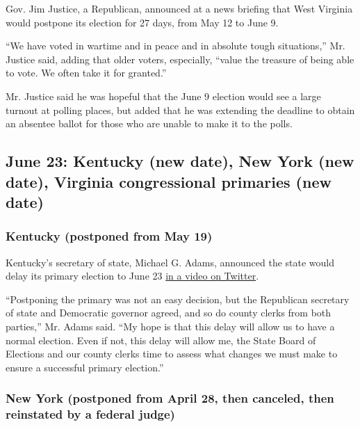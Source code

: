Gov. Jim Justice, a Republican, announced at a news briefing that West
Virginia would postpone its election for 27 days, from May 12 to June 9.

``We have voted in wartime and in peace and in absolute tough
situations,'' Mr. Justice said, adding that older voters, especially,
``value the treasure of being able to vote. We often take it for
granted.''

Mr. Justice said he was hopeful that the June 9 election would see a
large turnout at polling places, but added that he was extending the
deadline to obtain an absentee ballot for those who are unable to make
it to the polls.

\hypertarget{june-23-kentucky-new-date-new-york-new-date-virginia-congressional-primaries-new-date}{%
\subsection{June 23: Kentucky (new date), New York (new date), Virginia
congressional primaries (new
date)}\label{june-23-kentucky-new-date-new-york-new-date-virginia-congressional-primaries-new-date}}

\hypertarget{kentucky-postponed-from-may-19}{%
\subsubsection{Kentucky (postponed from May
19)}\label{kentucky-postponed-from-may-19}}

Kentucky's secretary of state, Michael G. Adams, announced the state
would delay its primary election to June 23
\href{https://twitter.com/KYSecState/status/1239657695520739328}{in a
video on Twitter}.

``Postponing the primary was not an easy decision, but the Republican
secretary of state and Democratic governor agreed, and so do county
clerks from both parties,'' Mr. Adams said. ``My hope is that this delay
will allow us to have a normal election. Even if not, this delay will
allow me, the State Board of Elections and our county clerks time to
assess what changes we must make to ensure a successful primary
election.''

\hypertarget{new-york-postponed-from-april-28-then-canceled-then-reinstated-by-a-federal-judge}{%
\subsubsection{New York (postponed from April 28, then canceled, then
reinstated by a federal
judge)}\label{new-york-postponed-from-april-28-then-canceled-then-reinstated-by-a-federal-judge}}

